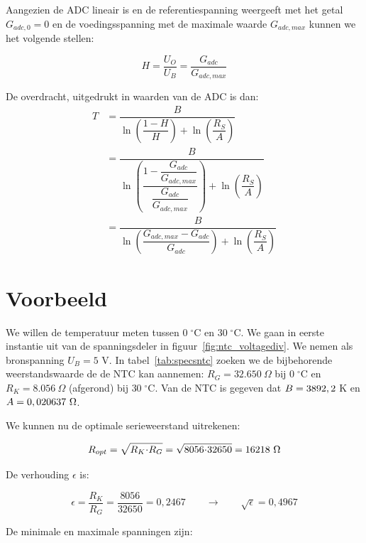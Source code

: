\documentclass[12pt,a4paper,final,twoside,fleqn]{article}
\newcommand{\mathcelc}[1]{\mbox{$#1\;^\circ\text{C}$}}
\newcommand{\ropt}{R_{opt}}
\let\oldcdot\cdot
\renewcommand{\cdot}{\kern-.10em\oldcdot\kern-.10em}
\begin{document}
Aangezien de ADC lineair is en de referentiespanning weergeeft met het getal $G_{adc,0} =0$  en
de voedingsspanning met de maximale waarde $G_{adc,max}$ kunnen we het volgende stellen:

\begin{equation}
H = \dfrac{U_O}{U_B} = \dfrac{G_{adc}}{G_{adc,max}}
\end{equation}

De overdracht, uitgedrukt in waarden van de ADC is dan:
\begin{equation}
\label{equ:transferTadc}
\begin{split}
T &= \dfrac{B}{\ln\left(\dfrac{1-H}{H}\right)+\ln\left(\dfrac{R_S}{A}\right)} \\
  &= \dfrac{B}{\ln\left(\dfrac{1-\dfrac{G_{adc}}{G_{adc,max}}}{\dfrac{G_{adc}}{G_{adc,max}}}\right)+\ln\left(\dfrac{R_S}{A}\right)} \\
  &= \dfrac{B}{\ln\left(\dfrac{G_{adc,max}-G_{adc}}{G_{adc}}\right)+\ln\left(\dfrac{R_S}{A}\right)}
\end{split}
\end{equation}



\clearpage
\section{Voorbeeld}
\label{sec:voorbeeld}
We willen de temperatuur meten tussen \mathcelc{0} en \mathcelc{30}. We gaan in
eerste instantie uit van de spanningsdeler in figuur~\ref{fig:ntc_voltagediv}.
We nemen als bronspanning $U_B=5$ V. In tabel~\ref{tab:specsntc} zoeken we de
bijbehorende weerstandswaarde de de NTC kan aannemen: $R_G=32.650\ \Omega$ bij
\mathcelc{0} en $R_K= 8.056\ \Omega$ (afgerond) bij \mathcelc{30}. Van de NTC
is gegeven dat $B=3892,2$ K en $A=0,020637\ \Omega$.

 We kunnen nu de optimale serieweerstand uitrekenen:

\begin{equation}
\ropt = \sqrt{R_K\cdot R_G} = \sqrt{8056\cdot32650} = 16218\ \Omega
\end{equation}

De verhouding $\epsilon$ is: 

\begin{equation}
\epsilon = \dfrac{R_K}{R_G} = \dfrac{8056}{32650} = 0,2467 \qquad \longrightarrow \qquad \sqrt{\epsilon} = 0,4967
\end{equation}

De minimale en maximale spanningen zijn:
\end{document}
